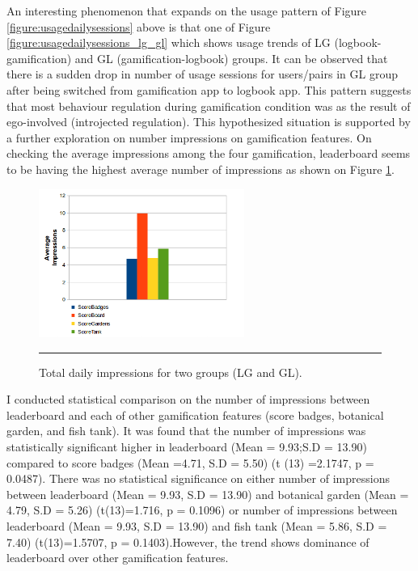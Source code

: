 An interesting phenomenon that expands on the usage pattern of Figure \ref{figure:usagedailysessions} above is that one of Figure \ref{figure:usagedailysessions_lg_gl} which shows usage trends of LG (logbook-gamification) and GL (gamification-logbook) groups. It can be observed that there is a sudden drop in number of usage sessions for users/pairs in GL group after being switched from gamification app to logbook app. This pattern suggests that most behaviour regulation during gamification condition was as the result of ego-involved (introjected regulation). This hypothesized situation is supported by a further exploration on number impressions on gamification features. On checking the average impressions among the four gamification, leaderboard seems to be having the highest average number of impressions as shown on Figure \ref{figure:gamification_impressions_latest_all}. 
\begin{figure}[htbp]
  \centering
    \includegraphics[width=0.6\textwidth]{Figures/gamification_impressions_latest_all.png}
    \rule{35em}{0.5pt}
  \caption{Total daily impressions for two groups (LG and GL).}
  \label{figure:gamification_impressions_latest_all}
\end{figure}
I conducted statistical comparison on the number of impressions between leaderboard and each of other gamification features (score badges, botanical garden, and fish tank). It was found that the number of impressions was statistically significant higher in leaderboard (Mean = 9.93;S.D = 13.90) compared to score badges (Mean =4.71, S.D = 5.50) (t (13) =2.1747, p = 0.0487). There was no statistical significance on either number of impressions between leaderboard (Mean = 9.93, S.D = 13.90) and botanical garden (Mean = 4.79, S.D = 5.26) (t(13)=1.716, p = 0.1096) or number of impressions between leaderboard (Mean = 9.93, S.D = 13.90) and fish tank (Mean = 5.86, S.D = 7.40) (t(13)=1.5707, p = 0.1403).However, the trend shows dominance of leaderboard over other gamification features. 

